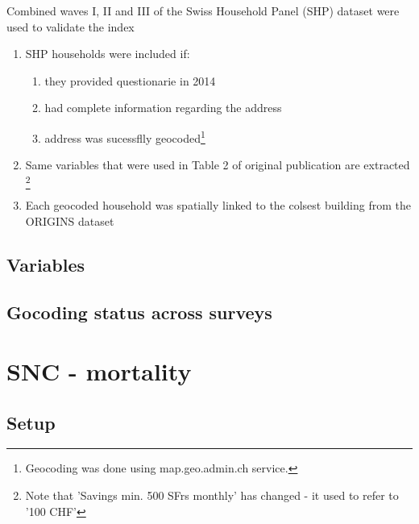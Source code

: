 \documentclass[a4paper, notitlepage, fleqn]{article} %
\begin{document}
Combined waves I, II and III of the Swiss Household Panel (SHP) dataset were used to validate the index

\begin{enumerate}

	\item SHP households were included if: 

	\begin{enumerate}	
		\item they provided questionarie in 2014 
		\item had complete information regarding the address
		\item address was sucessflly geocoded\footnote{Geocoding was done using map.geo.admin.ch service.}
	\end{enumerate}	
		
	\item Same variables that were used in Table 2 of original publication are extracted
		\footnote{Note that 'Savings min. 500 SFrs monthly' has changed - it used to refer to '100 CHF'}	
		
	\item Each geocoded household was spatially linked to the colsest building from the ORIGINS dataset 
\end{enumerate}
\subsection{Variables}
\begin{stlog}\end{stlog}
\subsection{Gocoding status across surveys}
\begin{stlog}\end{stlog}
\newpage
\section{SNC - mortality}

\subsection{Setup}
\end{document}
